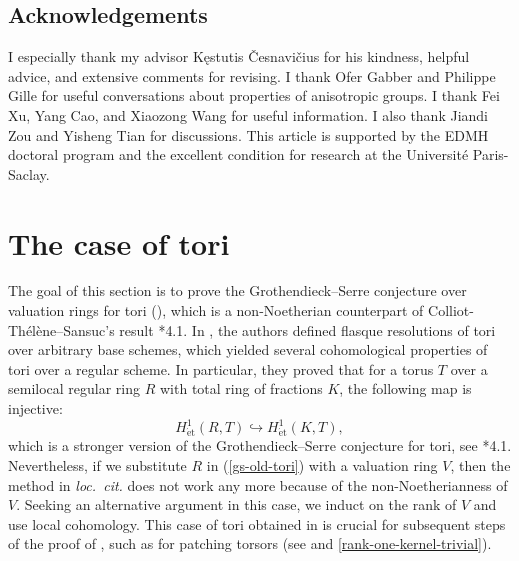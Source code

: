 \documentclass[a4paper,11pt,reqno]{amsart}
\newcommand{\hra}{\hookrightarrow}
\newcommand{\et}{\mathrm{\acute{e}t}}	                                           %
\theoremstyle{plain}
\theoremstyle{remark}
\theoremstyle{definition}
\theoremstyle{plain}
\theoremstyle{definition}
\theoremstyle{subsection-tweak}
\theoremstyle{subsection-tweak}
\numberwithin{equation}{subsection}
\begin{document}
      \subsection*{Acknowledgements} I especially thank my advisor K\k{e}stutis \v{C}esnavi\v{c}ius for his kindness, helpful advice, and extensive comments for revising. I thank Ofer Gabber and Philippe Gille for useful conversations about properties of anisotropic groups. I thank Fei Xu, Yang Cao, and Xiaozong Wang for useful information. I also thank Jiandi Zou and Yisheng Tian for discussions. This article is supported by the EDMH doctoral program and the excellent condition for research at the Universit\'e Paris-Saclay.
 
      \section{The case of tori}
      The goal of this section is to prove the Grothendieck--Serre conjecture over valuation rings for tori (), which is a non-Noetherian counterpart of Colliot-Th\'el\`      ene--Sansuc's result \cite{CTS87}*{4.1}.
      In \cite{CTS87}, the authors defined flasque resolutions of tori over arbitrary base schemes, which yielded several cohomological properties of tori over a regular scheme.
      In particular, they proved that for a torus $T$ over a semilocal regular ring $R$ with total ring of fractions $K$, the following map is injective:
      \begin{equation}\label{gs-old-tori}
        H^1_{\et}(R,T)\hra H^1_{\et}(K,T),
      \end{equation}
      which is a stronger version of the Grothendieck--Serre conjecture for tori, see \cite{CTS87}*{4.1}.
      Nevertheless, if we substitute $R$ in (\ref{gs-old-tori}) with a valuation ring $V$, then the method in \emph{loc.~cit.} does not work any more because of the non-Noetherianness of       $V$.
      Seeking an alternative argument in this case, we induct on the rank of $V$ and use local cohomology.
      This case of tori obtained in  is crucial for subsequent steps of the proof of , such as for patching torsors (see  and \ref{rank-one-kernel-trivial}).
      
\end{document}
